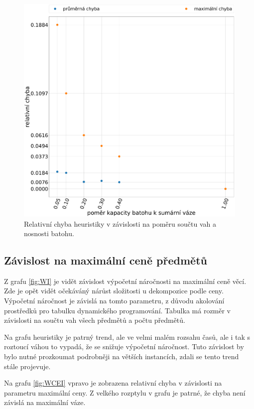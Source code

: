 \documentclass[11pt]{article}
\begin{document}
    

\begin{figure}\centering
	\includegraphics[scale=0.14]{img/mHE}
 	\caption[1]{Relativní chyba heuristiky v závislosti na poměru součtu vah a nosnosti batohu.}\label{fig:mEI}
 \end{figure} 	

\subsection{Závislost na maximální ceně předmětů}

Z grafu \ref{fig:WI} je vidět závislost výpočetní náročnosti na maximální ceně věcí. Zde je opět vidět očekáváný nárůst složitosti u dekompozice podle ceny. Výpočetní náročnost je závislá na tomto parametru, z důvodu akolování prostředků pro tabulku dynamického programování. Tabulka má rozměr v závislosti na součtu vah všech předmětů a počtu předmětů.

Na grafu heuristiky je patrný trend, ale ve velmi malém rozsahu časů, ale i tak s roztoucí váhou to vypadá, že se snižuje výpočetní náročnost. Tuto závislost by bylo nutné prozkoumat podrobněji na větších instancích, zdali se tento trend stále projevuje.

Na grafu \ref{fig:WCEI} vpravo je zobrazena relativní chyba v závislosti na parametru maximální ceny. Z velkého rozptylu v grafu je patrné, že chyba není závislá na maximální váze. 
\end{document}

